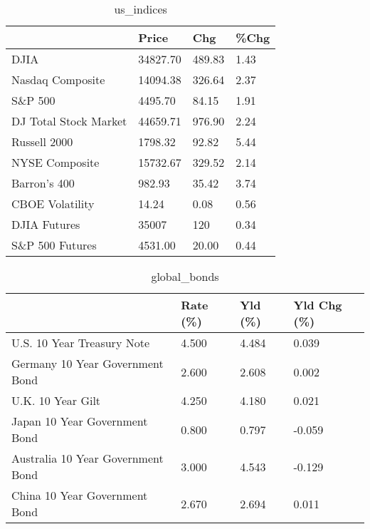 \documentclass{article}%
\begin{document}
%


\begin{table}[htbp]%
\caption{us\_indices}%
\centering%
\begin{adjustbox}{width=1\textwidth}%
\begin{tabular}{llll}
\toprule
                      &    Price &    Chg & \%Chg \\
\midrule
                 DJIA & 34827.70 & 489.83 & 1.43 \\
     Nasdaq Composite & 14094.38 & 326.64 & 2.37 \\
              S\&P 500 &  4495.70 &  84.15 & 1.91 \\
DJ Total Stock Market & 44659.71 & 976.90 & 2.24 \\
         Russell 2000 &  1798.32 &  92.82 & 5.44 \\
       NYSE Composite & 15732.67 & 329.52 & 2.14 \\
         Barron's 400 &   982.93 &  35.42 & 3.74 \\
      CBOE Volatility &    14.24 &   0.08 & 0.56 \\
         DJIA Futures &    35007 &    120 & 0.34 \\
      S\&P 500 Futures &  4531.00 &  20.00 & 0.44 \\
\bottomrule
\end{tabular}
%
\end{adjustbox}%
\end{table}

%


\begin{table}[htbp]%
\caption{global\_bonds}%
\centering%
\begin{adjustbox}{width=1\textwidth}%
\begin{tabular}{llll}
\toprule
                                  & Rate (\%) & Yld (\%) & Yld Chg (\%) \\
\midrule
       U.S. 10 Year Treasury Note &    4.500 &   4.484 &       0.039 \\
  Germany 10 Year Government Bond &    2.600 &   2.608 &       0.002 \\
                U.K. 10 Year Gilt &    4.250 &   4.180 &       0.021 \\
    Japan 10 Year Government Bond &    0.800 &   0.797 &      -0.059 \\
Australia 10 Year Government Bond &    3.000 &   4.543 &      -0.129 \\
    China 10 Year Government Bond &    2.670 &   2.694 &       0.011 \\
\bottomrule
\end{tabular}
%
\end{adjustbox}%
\end{table}
\end{document}
